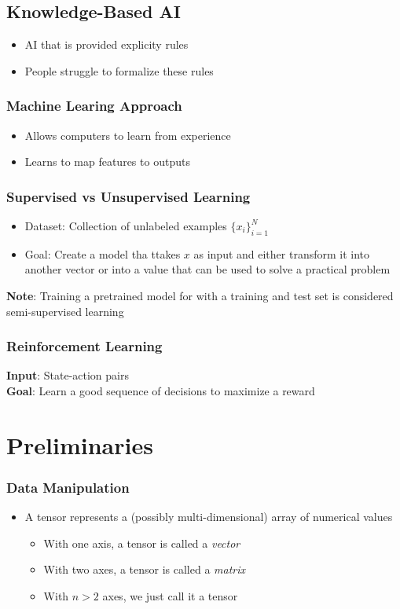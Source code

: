 \documentclass[12pt]{article}
\begin{document}
\subsection{Knowledge-Based AI}
\begin{itemize}
  \item AI that is provided explicity rules
  \item People struggle to formalize these rules
\end{itemize}

\subsubsection{Machine Learing Approach}
\begin{itemize}
  \item Allows computers to learn from experience
  \item Learns to map features to outputs
\end{itemize}

\subsubsection{Supervised vs Unsupervised Learning}

\begin{itemize}
  \item Dataset: Collection of unlabeled examples $\{x_{i}\}^{N}_{i=1}$
  \item Goal:  Create a model tha ttakes $x$ as input and either transform it into another vector or into a value that can be used to solve a practical problem
\end{itemize}

\textbf{Note}:  Training a pretrained model for with a training and test set is considered semi-supervised learning

\subsubsection{Reinforcement Learning}
\textbf{Input}: State-action pairs \\
\textbf{Goal}: Learn a good sequence of decisions to maximize a reward

\section{Preliminaries}
\subsubsection{Data Manipulation}
\begin{itemize}
  \item A tensor represents a (possibly multi-dimensional) array of numerical values
  \begin{itemize}
    \item With one axis, a tensor is called a \textit{vector}
    \item With two axes, a tensor is called a \textit{matrix}
    \item With $n > 2$ axes, we just call it a tensor
  \end{itemize}
\end{itemize}
\end{document}
